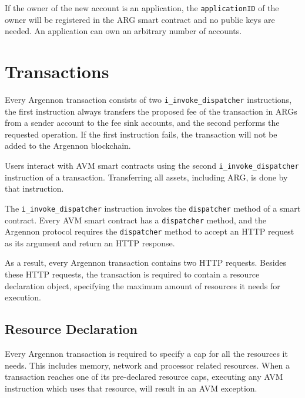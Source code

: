 If the owner of the new account is an application, the \texttt{applicationID} of the owner will be registered in the
ARG smart contract and no public keys are needed. An application can own an arbitrary number of accounts.



\section{Transactions}\label{sec:transactions}

Every Argennon transaction consists of two \texttt{i\_invoke\_dispatcher} instructions, the first instruction always
transfers the proposed fee of the transaction in ARGs from a sender account to the fee sink accounts, and
the second performs the requested operation. If the first instruction fails, the transaction will not be added to
the Argennon blockchain.

Users interact with AVM smart contracts using
the second \texttt{i\_invoke\_dispatcher} instruction of a transaction.
Transferring all assets, including ARG, is done by that instruction.

The \texttt{i\_invoke\_dispatcher} instruction invokes the \texttt{dispatcher} method of a smart contract. Every AVM
smart contract has a \texttt{dispatcher} method, and the Argennon protocol requires
the \texttt{dispatcher} method to accept an HTTP request as its argument and
return an HTTP response.

As a result, every Argennon transaction contains two HTTP requests. Besides these HTTP requests, the
transaction is required to contain a resource declaration object, specifying the maximum amount of resources
it needs for execution.


\subsection{Resource Declaration}\label{subsec:resource-declaration}

Every Argennon transaction is required to specify a cap for all the resources it needs. This
includes memory, network and processor related resources. When a transaction reaches one of its
pre-declared resource caps, executing any AVM instruction which uses that resource, will result in an AVM exception.

